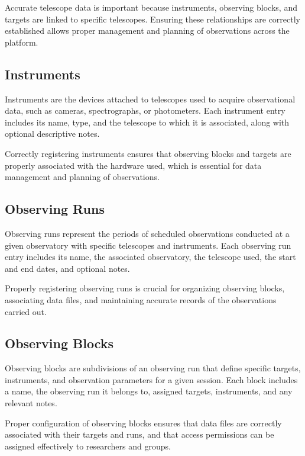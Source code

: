 Accurate telescope data is important because instruments, observing blocks, and targets are linked to specific telescopes. Ensuring these relationships are correctly established allows proper management and planning of observations across the platform.

\subsection{Instruments}

Instruments are the devices attached to telescopes used to acquire observational data, such as cameras, spectrographs, or photometers. Each instrument entry includes its name, type, and the telescope to which it is associated, along with optional descriptive notes.

\addimage

Correctly registering instruments ensures that observing blocks and targets are properly associated with the hardware used, which is essential for data management and planning of observations.


\subsection{Observing Runs}

Observing runs represent the periods of scheduled observations conducted at a given observatory with specific telescopes and instruments. Each observing run entry includes its name, the associated observatory, the telescope used, the start and end dates, and optional notes.

\addimage

Properly registering observing runs is crucial for organizing observing blocks, associating data files, and maintaining accurate records of the observations carried out.



\subsection{Observing Blocks}

Observing blocks are subdivisions of an observing run that define specific targets, instruments, and observation parameters for a given session. Each block includes a name, the observing run it belongs to, assigned targets, instruments, and any relevant notes.

\addimage

Proper configuration of observing blocks ensures that data files are correctly associated with their targets and runs, and that access permissions can be assigned effectively to researchers and groups.

